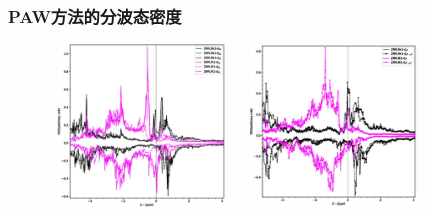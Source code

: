 \documentclass[cjk,slidestop,handout,compress,mathserif,blue]{beamer}	%
\begin{document}
\frame
{
	\frametitle{\textrm{PAW}方法的分波态密度}
\begin{figure}[h!]
\includegraphics[height=1.7in,width=1.95in,viewport=0 0 420 400,clip]{Figures/Ni_Re-2.jpg}
\includegraphics[height=1.7in,width=1.95in,viewport=0 0 420 400,clip]{Figures/Ni_Re-3.jpg}
\caption{\fontsize{7.2pt}{4.2pt}}%
\label{Ni-Re-DOS-d}
\end{figure} 
}
\end{document}
